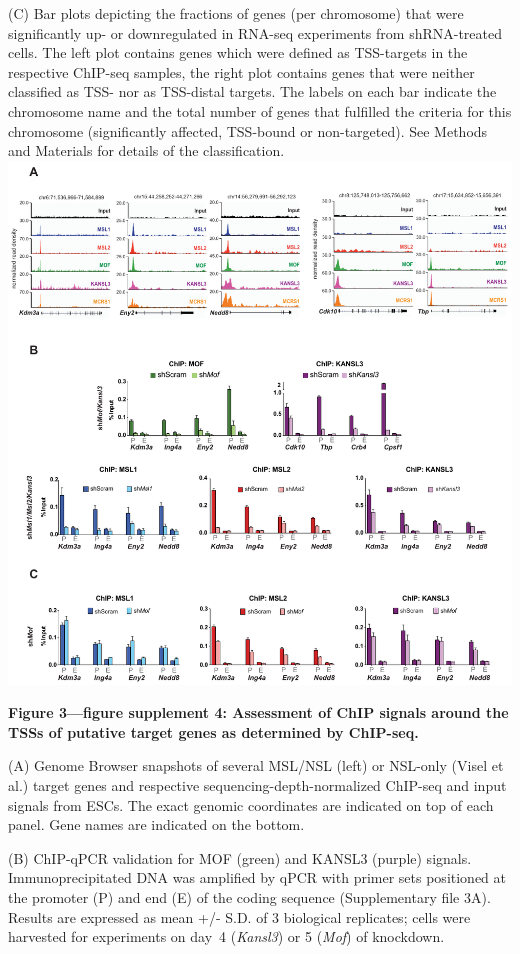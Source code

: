 \begin{footnotesize}
\begin{sffamily}
\begin{singlespacing}
(C) Bar plots depicting the fractions of genes (per chromosome) that were significantly up- or downregulated in RNA-seq experiments from shRNA-treated cells. The left plot contains genes which were defined as TSS-targets in the respective ChIP-seq samples, the right plot contains genes that were neither classified as TSS- nor as TSS-distal targets. The labels on each bar indicate the chromosome name and the total number of genes that fulfilled the criteria for this chromosome (significantly affected, TSS-bound or non-targeted). See Methods and Materials for details of the classification.
\newpage
\includegraphics[width=\textwidth]{Figures/Appendix/Figure3_supplemental_figure4_scissored.pdf}

\textbf{Figure 3—figure supplement 4: Assessment of ChIP signals around the TSSs of putative target genes as determined by ChIP-seq.}

(A) Genome Browser snapshots of several MSL/NSL (left) or NSL-only (Visel et al.) target genes and respective sequencing-depth-normalized ChIP-seq and input signals from ESCs. The exact genomic coordinates are indicated on top of each panel. Gene names are indicated on the bottom.

(B) ChIP-qPCR validation for MOF (green) and KANSL3 (purple) signals. Im\-mu\-no\-pre\-ci\-pi\-tated DNA was amplified by qPCR with primer sets positioned at the promoter (P) and end (E) of the coding sequence (Supplementary file 3A). Results are expressed as mean +/- S.D. of 3 biological replicates; cells were harvested for experiments on day~4 (\textit{Kansl3}) or 5 (\textit{Mof}) of knockdown.


\end{singlespacing}
\end{sffamily}
\end{footnotesize}

